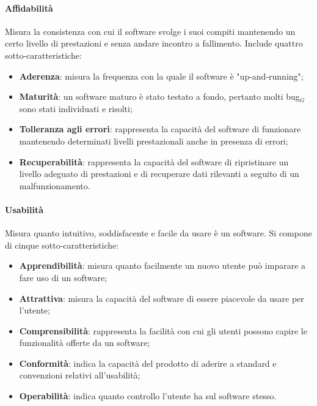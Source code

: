 \documentclass[10pt]{article}
\begin{document}
\begin{justify}
            \paragraph{Affidabilità}
            Misura la consistenza con cui il software svolge i suoi compiti mantenendo un certo livello di prestazioni e senza andare incontro a fallimento. Include quattro sotto-caratteristiche:
            \begin{itemize}
                \item \textbf{Aderenza}: misura la frequenza con la quale il software è "up-and-running";
                \item \textbf{Maturità}: un software maturo è stato testato a fondo, pertanto molti bug$_G$ sono stati individuati e risolti;
                \item \textbf{Tolleranza agli errori}: rappresenta la capacità del software di funzionare mantenendo determinati livelli prestazionali anche in presenza di errori;
                \item \textbf{Recuperabilità}: rappresenta la capacità del software di ripristinare un livello adeguato di prestazioni e di recuperare dati rilevanti a seguito di un malfunzionamento.
            \end{itemize}

            \paragraph{Usabilità}
            Misura quanto intuitivo, soddisfacente e facile da usare è un software. Si compone di cinque sotto-caratteristiche:
            \begin{itemize}
                \item \textbf{Apprendibilità}: misura quanto facilmente un nuovo utente può imparare a fare uso di un software;
                \item \textbf{Attrattiva}: misura la capacità del software di essere piacevole da usare per l'utente;
                \item \textbf{Comprensibilità}: rappresenta la facilità con cui gli utenti possono capire le funzionalità offerte da un software;
                \item \textbf{Conformità}: indica la capacità del prodotto di aderire a standard e convenzioni relativi all'usabilità;
                \item \textbf{Operabilità}: indica quanto controllo l'utente ha sul software stesso.
            \end{itemize}


\end{justify}
\end{document}
